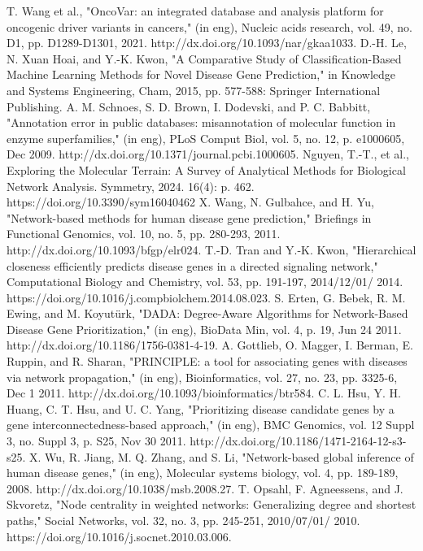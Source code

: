 \documentclass[5p,,preprint,12pt]{elsarticle}
\begin{document}
\begin{thebibliography}{71}
	T. Wang et al., "OncoVar: an integrated database and analysis platform for oncogenic driver variants in cancers," (in eng), Nucleic acids research, vol. 49, no. D1, pp. D1289-D1301, 2021. http://dx.doi.org/10.1093/nar/gkaa1033.
	D.-H. Le, N. Xuan Hoai, and Y.-K. Kwon, "A Comparative Study of Classification-Based Machine Learning Methods for Novel Disease Gene Prediction," in Knowledge and Systems Engineering, Cham, 2015, pp. 577-588: Springer International Publishing.
	A. M. Schnoes, S. D. Brown, I. Dodevski, and P. C. Babbitt, "Annotation error in public databases: misannotation of molecular function in enzyme superfamilies," (in eng), PLoS Comput Biol, vol. 5, no. 12, p. e1000605, Dec 2009. http://dx.doi.org/10.1371/journal.pcbi.1000605.
	Nguyen, T.-T., et al., Exploring the Molecular Terrain: A Survey of Analytical Methods for Biological Network Analysis. Symmetry, 2024. 16(4): p. 462. https://doi.org/10.3390/sym16040462
	X. Wang, N. Gulbahce, and H. Yu, "Network-based methods for human disease gene prediction," Briefings in Functional Genomics, vol. 10, no. 5, pp. 280-293, 2011. http://dx.doi.org/10.1093/bfgp/elr024.
	T.-D. Tran and Y.-K. Kwon, "Hierarchical closeness efficiently predicts disease genes in a directed signaling network," Computational Biology and Chemistry, vol. 53, pp. 191-197, 2014/12/01/ 2014. https://doi.org/10.1016/j.compbiolchem.2014.08.023.
	S. Erten, G. Bebek, R. M. Ewing, and M. Koyutürk, "DADA: Degree-Aware Algorithms for Network-Based Disease Gene Prioritization," (in eng), BioData Min, vol. 4, p. 19, Jun 24 2011. http://dx.doi.org/10.1186/1756-0381-4-19.
	A. Gottlieb, O. Magger, I. Berman, E. Ruppin, and R. Sharan, "PRINCIPLE: a tool for associating genes with diseases via network propagation," (in eng), Bioinformatics, vol. 27, no. 23, pp. 3325-6, Dec 1 2011. http://dx.doi.org/10.1093/bioinformatics/btr584.
	C. L. Hsu, Y. H. Huang, C. T. Hsu, and U. C. Yang, "Prioritizing disease candidate genes by a gene interconnectedness-based approach," (in eng), BMC Genomics, vol. 12 Suppl 3, no. Suppl 3, p. S25, Nov 30 2011. http://dx.doi.org/10.1186/1471-2164-12-s3-s25.
	X. Wu, R. Jiang, M. Q. Zhang, and S. Li, "Network-based global inference of human disease genes," (in eng), Molecular systems biology, vol. 4, pp. 189-189, 2008. http://dx.doi.org/10.1038/msb.2008.27.
	T. Opsahl, F. Agneessens, and J. Skvoretz, "Node centrality in weighted networks: Generalizing degree and shortest paths," Social Networks, vol. 32, no. 3, pp. 245-251, 2010/07/01/ 2010. https://doi.org/10.1016/j.socnet.2010.03.006.

\end{thebibliography}
\end{document}
